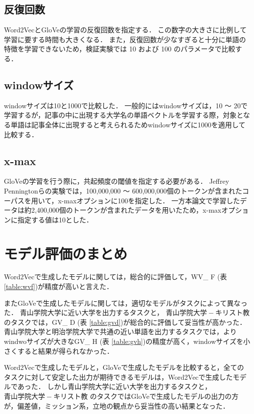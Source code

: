 \subsection{反復回数}
Word2VecとGloVeの学習の反復回数を指定する．
この数字の大きさに比例して学習に要する時間も大きくなる．
また，反復回数が少なすぎると十分に単語の特徴を学習できないため，検証実験では 10 および 100 のパラメータで比較する．

\subsection{windowサイズ}
windowサイズは10と1000で比較した．
一般的にはwindowサイズは，10 〜 20で学習するが，記事の中に出現する大学名の単語ベクトルを学習する際，対象となる単語は記事全体に出現すると考えられるためwindowサイズに1000を適用して比較する．

\subsection{x-max}
GloVeの学習を行う際に，共起頻度の閾値を指定する必要がある．
Jeffrey Penningtonらの実験では，100,000,000 〜 600,000,000個のトークンが含まれたコーパスを用いて，x-maxオプションに100を指定した．
一方本論文で学習したデータは約2,400,000個のトークンが含まれたデータを用いたため，x-maxオプションに指定する値は10とした．










\section{モデル評価のまとめ}
Word2Vecで生成したモデルに関しては，総合的に評価して，WV\_ F (表 \ref{table:wvf})が精度が高いと言えた．

またGloVeで生成したモデルに関しては，適切なモデルがタスクによって異なった．
青山学院大学に近い大学を出力するタスクと， $ 青山学院大学 - キリスト教 $ のタスクでは，GV\_ D (表 \ref{table:gvd})が総合的に評価して妥当性が高かった．
青山学院大学と明治学院大学で共通の近い単語を出力するタスクでは，よりwindwoサイズが大きなGV\_ H (表 \ref{table:gvh})の精度が高く，windowサイズを小さくすると結果が得られなかった．

Word2Vecで生成したモデルと，GloVeで生成したモデルを比較すると，全てのタスクに対して安定した出力が期待できるモデルは，Word2Vecで生成したモデルであった．
しかし青山学院大学に近い大学を出力するタスクと， $ 青山学院大学 - キリスト教 $ のタスクではGloVeで生成したモデルの出力の方が，偏差値，ミッション系，立地の観点から妥当性の高い結果となった．
